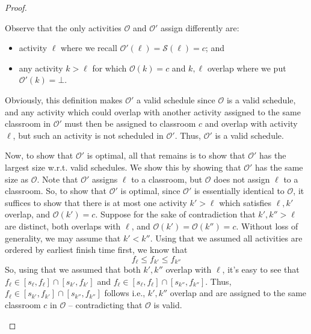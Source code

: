 \documentclass{article}
\theoremstyle{plain}%
\theoremstyle{definition}
\theoremstyle{remark}
\begin{document}
\begin{proof}
\begin{itemize}
            Observe that the only activities $\mathcal{O}$ and $\mathcal{O}'$
                assign differently are:
            \begin{itemize}
                \item activity $\ell$ where we recall $\mathcal{O}'(\ell) = \mathcal{S}(\ell) =c$; and
                \item any activity $k > \ell$ for which $\mathcal{O}(k) =c$ and
                    $k,\ell$ overlap where we put $\mathcal{O}'(k) = \bot$.
            \end{itemize}

            Obviously, this definition makes $\mathcal{O}'$ a valid schedule
                since $\mathcal{O}$ is a valid schedule, and any activity which
                could overlap with another activity assigned to the same
                classroom in $\mathcal{O}'$ must then be assigned to classroom
                $c$ and overlap with activity $\ell$, but such an activity is
                not scheduled in $\mathcal{O}'$.
            Thus, $\mathcal{O}'$ is a valid schedule.

            Now, to show that $\mathcal{O}'$ is optimal, all that remains is to
                show that $\mathcal{O}'$ has the largest size w.r.t. valid schedules.
            We show this by showing that $\mathcal{O}'$ has the same size as
                $\mathcal{O}$.
            Note that $\mathcal{O}'$ assigns $\ell$ to a classroom, but
                $\mathcal{O}$ does not assign $\ell$ to a classroom.
            So, to show that $\mathcal{O}'$ is optimal, since 
                $\mathcal{O}'$ is essentially identical to $\mathcal{O}$,
                it suffices to show that there is at most one activity $k' > \ell$
                which satisfies $\ell,k'$ overlap, and $\mathcal{O}(k') = c$.
            Suppose for the sake of contradiction that $k',k'' > \ell$ are distinct,
                both overlaps with $\ell$, 
                and $\mathcal{O}(k') = \mathcal{O}(k'') = c$.
            Without loss of generality, we may assume that $k' < k''$.
            Using that we assumed all activities are ordered by earliest finish time first, we know that
            \begin{equation}
                f_{\ell} \le f_{k'} \le f_{k''}
            \end{equation}
            So, using that we assumed that both $k',k''$ overlap with $\ell$, 
                it's easy to see that
                $ f_\ell \in [s_\ell, f_\ell] \cap [s_{k'}, f_{k'}]$
                and
                $f_\ell \in [s_\ell, f_\ell] \cap [s_{k''}, f_{k''}]$.
            Thus, $f_\ell \in [s_{k'}, f_{k'}] \cap [s_{k''}, f_{k''}]$ follows i.e.,
                $k',k''$ overlap and are assigned to the same classroom
                $c$ in $\mathcal{O}$ -- contradicting that $\mathcal{O}$ is valid.


\end{itemize}
\end{proof}
\end{document}

